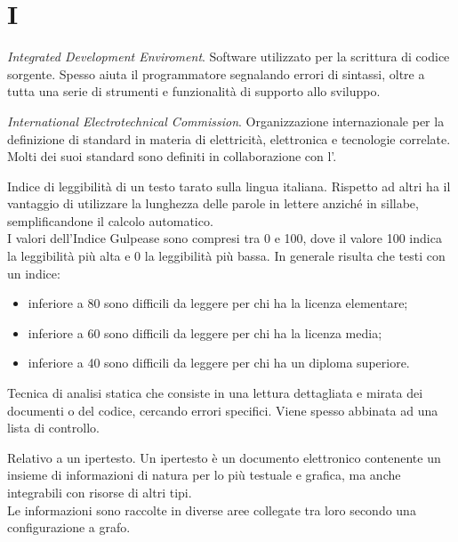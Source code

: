 \section{I}

\textit{Integrated Development Enviroment}. Software utilizzato per la scrittura di codice sorgente. Spesso aiuta il programmatore segnalando errori di sintassi, oltre a tutta una serie di strumenti e funzionalità di supporto allo sviluppo.


\textit{International Electrotechnical Commission}. Organizzazione internazionale per la definizione di standard in materia di elettricità, elettronica e tecnologie correlate. Molti dei suoi standard sono definiti in collaborazione con l'.

Indice di leggibilità di un testo tarato sulla lingua italiana. Rispetto ad altri ha il vantaggio di utilizzare la lunghezza delle parole in lettere anziché in sillabe, semplificandone il calcolo automatico. \\
I valori dell'Indice Gulpease sono compresi tra 0 e 100, dove il valore 100 indica la leggibilità più alta e 0 la leggibilità più bassa. In generale risulta che testi con un indice:
\begin{itemize}
	\item inferiore a 80 sono difficili da leggere per chi ha la licenza elementare;
	\item inferiore a 60 sono difficili da leggere per chi ha la licenza media;
	\item inferiore a 40 sono difficili da leggere per chi ha un diploma superiore.
\end{itemize}


Tecnica di analisi statica che consiste in una lettura dettagliata e mirata dei documenti o del codice, cercando errori specifici. Viene spesso abbinata ad una lista di controllo.

Relativo a un ipertesto. Un ipertesto è un documento elettronico contenente un insieme di informazioni di natura per lo più testuale e grafica, ma anche integrabili con risorse di altri tipi. \\
Le informazioni sono raccolte in diverse aree collegate tra loro secondo una configurazione a grafo.

